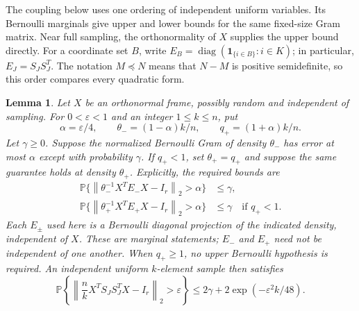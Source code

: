 \documentclass[11pt]{article}
\newtheorem{lemma}[theorem]{Lemma}
\theoremstyle{definition}
\theoremstyle{remark}
\theoremstyle{plain}
\newcommand{\Prob}{\mathbb P}
\newcommand{\one}{\mathbf 1}
\newcommand{\norm}[1]{\left\lVert#1\right\rVert_2}
\begin{document}
The coupling below uses one ordering of independent uniform
variables. Its Bernoulli marginals give upper and lower bounds
for the same fixed-size Gram matrix. Near full sampling, the
orthonormality of $X$ supplies the upper bound directly.
For a coordinate set $B$, write
$E_B=\operatorname{diag}(\one_{\{i\in B\}}:i\in K)$; in particular,
$E_J=S_JS_J^T$. The notation $M\preceq N$ means that $N-M$ is positive
semidefinite, so this order compares every quadratic form.

\begin{lemma}\label{lem:sampling}
Let \(X\) be an orthonormal frame, possibly random and independent
of sampling. For \(0<\varepsilon<1\) and an integer \(1\le k\le n\), put
\[
 \alpha=\varepsilon/4,\qquad
 \theta_-=(1-\alpha)k/n,\qquad q_+=(1+\alpha)k/n.
\]
Let $\gamma\ge0$. Suppose the normalized Bernoulli Gram of density
$\theta_-$ has error at most $\alpha$ except with probability $\gamma$.
If $q_+<1$, set $\theta_+=q_+$ and suppose the same guarantee
holds at density $\theta_+$. Explicitly, the required bounds are
\begin{equation}\label{eq:sampling-hypotheses}
\begin{aligned}
 \Prob\{\norm{\theta_-^{-1}X^TE_-X-I_r}>\alpha\}
          &\le\gamma,\\
 \Prob\{\norm{\theta_+^{-1}X^TE_+X-I_r}>\alpha\}
          &\le\gamma\quad\text{if }q_+<1.
\end{aligned}
\end{equation}
Each $E_\pm$ used here is a Bernoulli diagonal projection of the
indicated density, independent of $X$. These are marginal statements;
$E_-$ and $E_+$ need not be independent of one another.
When $q_+\ge1$, no upper Bernoulli hypothesis is required.
An independent uniform \(k\)-element sample then satisfies
\begin{equation}\label{eq:sampling-bound}
 \Prob\left\{\norm{\frac nk X^TS_JS_J^TX-I_r}>\varepsilon\right\}
 \le2\gamma+2\exp(-\varepsilon^2 k/48).
\end{equation}
\end{lemma}
\end{document}
